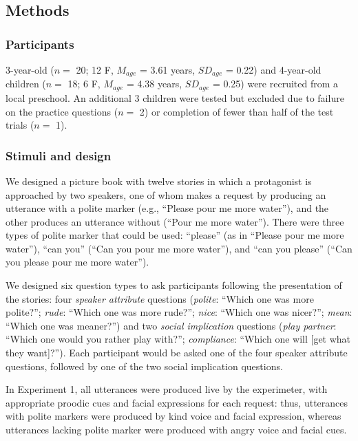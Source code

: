 \documentclass[10pt, letterpaper]{article}
\begin{document}
\subsection{Methods}\label{methods}

\subsubsection{Participants}\label{participants}

3-year-old (\(n=\) 20; 12 F, \(M_{age}\) = 3.61 years, \(SD_{age}\) =
0.22) and 4-year-old children (\(n=\) 18; 6 F, \(M_{age}\) = 4.38 years,
\(SD_{age}\) = 0.25) were recruited from a local preschool. An
additional 3 children were tested but excluded due to failure on the
practice questions (\(n=\) 2) or completion of fewer than half of the
test trials (\(n=\) 1).

\subsubsection{Stimuli and design}\label{stimuli-and-design}

We designed a picture book with twelve stories in which a protagonist is
approached by two speakers, one of whom makes a request by producing an
utterance with a polite marker (e.g., ``Please pour me more water''),
and the other produces an utterance without (``Pour me more water'').
There were three types of polite marker that could be used: ``please''
(as in ``Please pour me more water''), ``can you'' (``Can you pour me
more water''), and ``can you please'' (``Can you please pour me more
water'').

We designed six question types to ask participants following the
presentation of the stories: four \emph{speaker attribute} questions
(\emph{polite}: ``Which one was more polite?''; \emph{rude}: ``Which one
was more rude?''; \emph{nice}: ``Which one was nicer?''; \emph{mean}:
``Which one was meaner?'') and two \emph{social implication} questions
(\emph{play partner}: ``Which one would you rather play with?'';
\emph{compliance}: ``Which one will {[}get what they want{]}?''). Each
participant would be asked one of the four speaker attribute questions,
followed by one of the two social implication questions.

In Experiment 1, all utterances were produced live by the experimeter,
with appropriate proodic cues and facial expressions for each request:
thus, utterances with polite markers were produced by kind voice and
facial expression, whereas utterances lacking polite marker were
produced with angry voice and facial cues.
\end{document}
